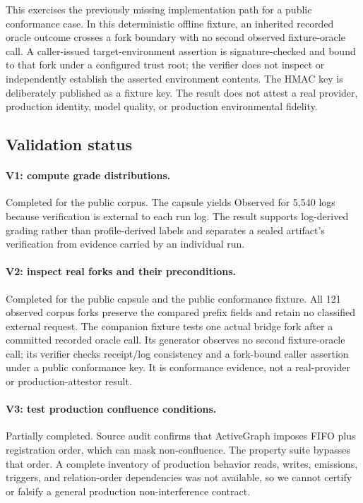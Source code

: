 This exercises the previously missing implementation path for a public
conformance case.  In this deterministic offline fixture, an inherited recorded
oracle outcome crosses a fork boundary with no second observed fixture-oracle
call.  A caller-issued target-environment assertion is signature-checked and
bound to that fork under a configured trust root; the verifier does not inspect
or independently establish the asserted environment contents.  The HMAC key is
deliberately published as a fixture key.  The result does not attest a real
provider, production identity, model quality, or production environmental
fidelity.

\subsection{Validation status}

\paragraph{V1: compute grade distributions.}
Completed for the public corpus.  The capsule yields Observed for 5,540 logs
because verification is external to each run log.  The result supports
log-derived grading rather than profile-derived labels and separates a sealed
artifact's verification from evidence carried by an individual run.

\paragraph{V2: inspect real forks and their preconditions.}
Completed for the public capsule and the public conformance fixture.  All 121
observed corpus forks preserve the compared prefix fields and retain no
classified external request.  The companion fixture tests one actual bridge
fork after a committed recorded oracle call.  Its generator observes no second
fixture-oracle call; its verifier checks receipt/log consistency and a
fork-bound caller assertion under a public conformance key.  It is conformance
evidence, not a real-provider or production-attestor result.

\paragraph{V3: test production confluence conditions.}
Partially completed.  Source audit confirms that ActiveGraph imposes FIFO plus
registration order, which can mask non-confluence.  The property suite bypasses
that order.  A complete inventory of production behavior reads, writes,
emissions, triggers, and relation-order dependencies was not available, so we
cannot certify or falsify a general production non-interference contract.

